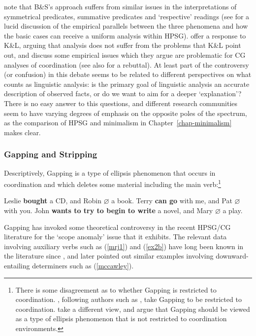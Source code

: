 \documentclass[output=paper]{langsci/langscibook}
\begin{document}
\citet{kubota-levine-coord} note that B\&S's approach suffers from similar
issues in the interpretations of symmetrical predicates, summative
predicates and `respective' readings (see \citet{chaves12} for a lucid
discussion of the empirical parallels between the three phenomena and
how the basic cases can receive a uniform analysis within HPSG).
\citet{yatabe-tam2017} offer a response to K\&L, arguing that 
analysis does not suffer from the problems that K\&L point out, and
discuss some empirical issues which they argue are problematic for CG
analyses of coordination (see also \citet{kubota-levine-summative} for a
rebuttal). At least part of the controversy (or confusion) in this
debate seems to be related to different perspectives on what counts as
linguistic analysis: is the primary goal of linguistic analysis an
accurate description of observed facts, or do we want to aim for a
deeper `explanation'? There is no easy answer to this questions, and
different research communities seem to have varying degrees of
emphasis on the opposite poles of the spectrum, as the comparison
of HPSG and minimalism in Chapter~\ref{chap-minimalism} makes clear.


\subsubsection{Gapping and Stripping \label{sec:gapping}}

Descriptively, Gapping is a type of ellipsis phenomenon that occurs
in coordination and which deletes some material including the main
verb:\footnote{There is some disagreement as to whether Gapping is
restricted to coordination. \citet{kubota-levine-gapping}, following authors
such as \citet{johnson2009}, take Gapping to be restricted to coordination.
\citet{parkea18gapping} take a different view, and argue that Gapping
should be viewed as a type of ellipsis phenomenon that is not
restricted to coordination environments.}

\begin{exe}
 \ex\label{gapping}
  \begin{xlist}
 \ex\label{}
    Leslie \textbf{bought} a CD, and Robin   \ensuremath{\varnothing}  a book.
 \ex\label{}
    Terry \textbf{can go} with me, and Pat  \ensuremath{\varnothing}  with you.
 \ex\label{}
    John \textbf{wants to try to begin to write} a novel, and Mary  \ensuremath{\varnothing}  a play.
  \end{xlist}
\end{exe}
Gapping has invoked some theoretical controversy in the recent
HPSG/CG literature for the `scope anomaly' issue that it exhibits.
The relevant data involving auxiliary verbs such as (\ref{mrj1}) and (\ref{ex2b})
have long been known in the literature since \citet{oehrle71,oehrle1987},
\citet{siegel87} and \citet{mccawley1993} later pointed out similar examples
involving downward-entailing determiners such as (\ref{mccawley}).
\end{document}
